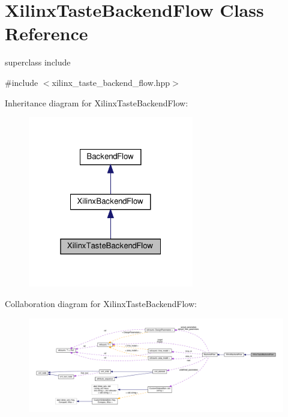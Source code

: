 \hypertarget{classXilinxTasteBackendFlow}{}\section{Xilinx\+Taste\+Backend\+Flow Class Reference}
\label{classXilinxTasteBackendFlow}


superclass include  




{\ttfamily \#include $<$xilinx\+\_\+taste\+\_\+backend\+\_\+flow.\+hpp$>$}



Inheritance diagram for Xilinx\+Taste\+Backend\+Flow\+:
\nopagebreak
\begin{figure}[H]
\begin{center}
\leavevmode
\includegraphics[width=205pt]{d1/d36/classXilinxTasteBackendFlow__inherit__graph}
\end{center}
\end{figure}


Collaboration diagram for Xilinx\+Taste\+Backend\+Flow\+:
\nopagebreak
\begin{figure}[H]
\begin{center}
\leavevmode
\includegraphics[width=350pt]{d9/d85/classXilinxTasteBackendFlow__coll__graph}
\end{center}
\end{figure}
